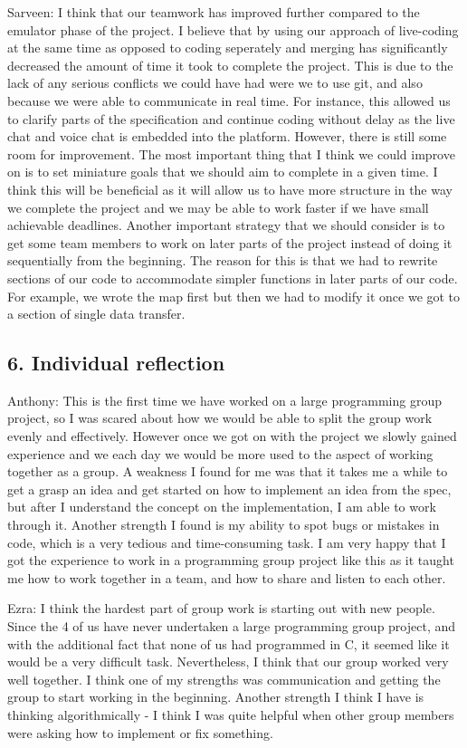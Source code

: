 \documentclass[a4paper]{article}
\begin{document}
Sarveen: I think that our teamwork has improved further compared to the emulator phase of the project. I believe that
by using our approach of live-coding at the same time as opposed to coding seperately and merging has significantly
decreased the amount of time it took to complete the project. This is due to the lack of any serious conflicts we could
have had were we to use git, and also because we were able to communicate in real time. For instance, this allowed us 
to clarify parts of the specification and continue coding without delay as the live chat and voice chat is embedded
into the platform. However, there is still some room for improvement. The most important thing that I think we could 
improve on is to set miniature goals that we should aim to complete in a given time. I think this will be beneficial 
as it will allow us to have more structure in the way we complete the project and we may be able to work faster if we
have small achievable deadlines. Another important strategy that we should consider is to get some team members to work
on later parts of the project instead of doing it sequentially from the beginning. The reason for this is that we had 
to rewrite sections of our code to accommodate simpler functions in later parts of our code.  For example, we wrote the 
map first but then we had to modify it once we got to a section of single data transfer. 

\bigskip
\subsection*{6. Individual reflection}

Anthony: This is the first time we have worked on a large programming group project, so I was scared about how we would be 
able to split the group work evenly and effectively. However once we got on with the project we slowly gained experience 
and we each day we would be more used to the aspect of working together as a group. A weakness I found for me was that it 
takes me a while to get a grasp an idea and get started on how to implement an idea from the spec, but after I understand 
the concept on the implementation, I am able to work through it. Another strength I found is my ability to spot bugs or 
mistakes in code, which is a very tedious and time-consuming task. I am very happy that I got the experience to work in a 
programming group project like this as it taught me how to work together in a team, and how to share and listen to each other.

Ezra: I think the hardest part of group work is starting out with new people. Since the 4 of us have never undertaken a 
large programming group project, and with the additional fact that none of us had programmed in C, it seemed like it would
be a very difficult task. Nevertheless, I think that our group worked very well together. I think one of my strengths was 
communication and getting the group to start working in the beginning. Another strength I think I have is thinking algorithmically - 
I think I was quite helpful when other group members were asking how to implement or fix something. 
\end{document}
